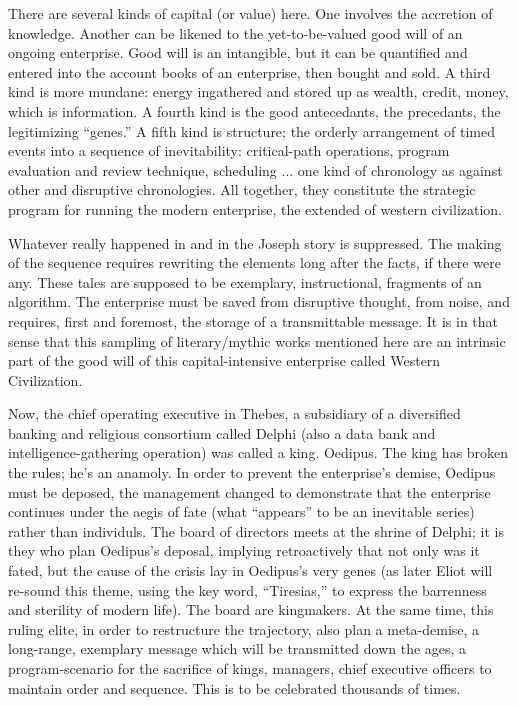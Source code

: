 There are several kinds of capital (or value) here. One involves the accretion of knowledge. Another can be likened to the yet-to-be-valued good will of an ongoing enterprise. Good will is an intangible, but it can be quantified and entered into the account books of an enterprise, then bought and sold. A third kind is more mundane: energy ingathered and stored up as wealth, credit, money, which is information. A fourth kind is the good antecedants, the precedants, the legitimizing \enquote{genes.} A fifth kind is structure; the orderly arrangement of timed events into a sequence of inevitability: critical-path operations, program evaluation and review technique, scheduling ... one kind of chronology as against other and disruptive chronologies. All together, they constitute the strategic program for running the modern enterprise, the extended  of western civilization.

Whatever really happened in  and in the Joseph story is suppressed. The making of the sequence requires rewriting the elements long after the facts, if there were any. These tales are supposed to be exemplary, instructional, fragments of an algorithm. The enterprise must be saved from disruptive thought, from noise, and requires, first and foremost, the storage of a transmittable message. It is in that sense that this sampling of literary\slash mythic works mentioned here are an intrinsic part of the good will of this capital-intensive enterprise called Western Civilization.

Now, the chief operating executive in Thebes, a subsidiary of a diversified banking and religious consortium called Delphi (also a data bank and intelligence-gathering operation) was called a king. Oedipus. The king has broken the rules; he's an anamoly. In order to prevent the enterprise's demise, Oedipus must be deposed, the management changed to demonstrate that the enterprise continues under the aegis of fate (what \enquote{appears} to be an inevitable series) rather than individuls. The board of directors meets at the shrine of Delphi; it is they who plan Oedipus's deposal, implying retroactively that not only was it fated, but the cause of the crisis lay in Oedipus's very genes (as later Eliot will re-sound this theme, using the key word, \enquote{Tiresias,} to express the barrenness and sterility of modern life). The board are kingmakers. At the same time, this ruling elite, in order to restructure the trajectory, also plan a meta-demise, a long-range, exemplary message which will be transmitted down the ages, a program-scenario for the sacrifice of kings, managers, chief executive officers to maintain order and sequence. This is to be celebrated thousands of times.

